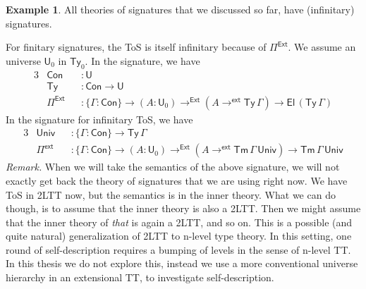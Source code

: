 \documentclass[12pt,a4paper,twoside,openany]{book}
\theoremstyle{remark}
\theoremstyle{definition}
\newtheorem{myexample}{Example}
\theoremstyle{theorem}
\newcommand{\ms}[1]{\mathsf{#1}}
\newcommand{\Ty}{\mathsf{Ty}}
\newcommand{\U}{\mathsf{U}}
\newcommand{\El}{\mathsf{El}}
\newcommand{\Pie}{\Pi^{\mathsf{Ext}}}
\newcommand{\toe}{\to^{\ms{Ext}}}
\newcommand{\Piinf}{\Pi^{\mathsf{ext}}}
\newcommand{\toinf}{\to^{\ms{ext}}}
\begin{document}
\begin{myexample}
All theories of signatures that we discussed so far, have (infinitary)
signatures.

For finitary signatures, the ToS is itself infinitary because of $\Pie$. We
assume an universe $\U_0$ in $\Ty_0$. In the signature, we have
\begin{alignat*}{3}
  &\ms{Con} &&: \U \\
  &\ms{Ty} &&: \ms{Con} \to \U\\
  &\Pie &&: \{\Gamma : \ms{Con}\} \to (A : \U_0) \toe (A \toinf \ms{Ty}\,\Gamma) \to \El\,(\ms{Ty}\,\Gamma)
\end{alignat*}
In the signature for infinitary ToS, we have
\begin{alignat*}{3}
  &\ms{Univ} &&: \{\Gamma : \ms{Con}\} \to \ms{Ty}\,\Gamma\\
  &\Piinf    &&: \{\Gamma : \ms{Con}\} \to (A : \U_0) \toe (A \toinf \ms{Tm}\,\Gamma\,\ms{Univ}) \to \ms{Tm}\,\Gamma\,\ms{Univ}
\end{alignat*}
\emph{Remark.}
When we will take the semantics of the above signature, we will not exactly get
back the theory of signatures that we are using right now. We have ToS in 2LTT
now, but the semantics is in the inner theory. What we can do though, is to
assume that the inner theory is also a 2LTT. Then we might assume that the inner
theory of \emph{that} is again a 2LTT, and so on. This is a possible (and quite
natural) generalization of 2LTT to n-level type theory. In this setting, one
round of self-description requires a bumping of levels in the sense of n-level TT. In
this thesis we do not explore this, instead we use a more conventional universe
hierarchy in an extensional TT, to investigate self-description.
\end{myexample}
\end{document}
